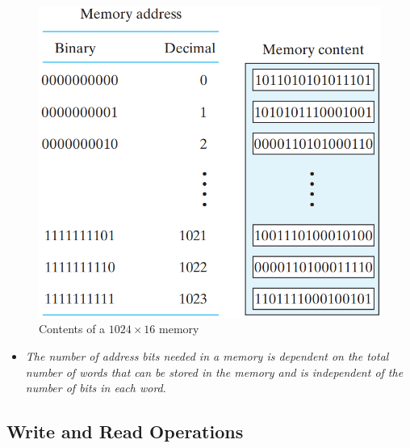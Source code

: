 \begin{figure}[H]
  \centering
  \includegraphics[width=\linewidth]{img/fig-7.3.png}
  \caption{Contents of a $1024 \times 16$ memory}
  \label{fig:7.3}
\end{figure}

\begin{itemize}[leftmargin=0.6cm]
  \item \textit{The number of address bits needed in a memory is dependent on the total number of words that can be stored in the memory and is independent of the number of bits in each word}.
\end{itemize}

\subsection{Write and Read Operations}
\label{subsec:write-read-operations}

